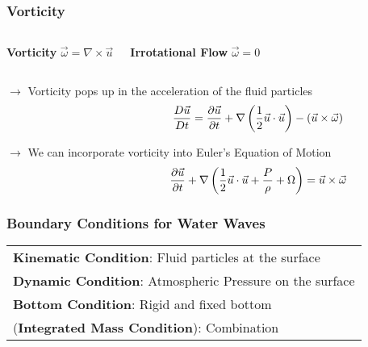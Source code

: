 \documentclass[fleqn]{beamer}
\newcommand{\tabitem}{%
  \usebeamertemplate{itemize item}\hspace*{\labelsep}}
\begin{document}
    \begin{frame}
        \frametitle{Vorticity}
        \begin{columns}
            \begin{block}{\centering\textbf{Vorticity}}
                \centering
                $\vec{\omega} = \nabla \times \vec{u}$
            \end{block}
            \begin{block}{\centering\textbf{Irrotational Flow}}
                \centering
                $\vec{\omega} = 0$
            \end{block}
        \end{columns}
        \vspace{0.5cm}

        \centering $\rightarrow$ Vorticity pops up in the acceleration of
        the fluid particles
        \begin{align}
            \hspace{0.25\linewidth}
            \frac{D\vec{u}}{Dt} = \frac{\partial \vec{u}}{\partial t}+
            \nabla \left( \frac{1}{2} \vec{u} \cdot \vec{u}\right)  - \left(
            \vec{u}\times \vec{\omega}  \right)\nonumber
        \end{align}

        \centering $\rightarrow$ We can incorporate vorticity into Euler's
        Equation of Motion
        \begin{align}
            \hspace{0.25\linewidth}\frac{\partial \vec{u}}{\partial t} + \nabla\left(
            \frac{1}{2}\vec{u}\cdot\vec{u} + \frac{P}{\rho} + \Omega \right)
            = \vec{u} \times \vec{\omega} \nonumber
        \end{align}
    \end{frame}

    \begin{frame}
        \frametitle{Boundary Conditions for Water Waves}
        \begin{center}
        \begin{tabular}{@{}l@{}}
        \tabitem \textbf{Kinematic Condition}: Fluid particles at the
            surface\\
        \tabitem \textbf{Dynamic Condition}: Atmospheric Pressure on
            the surface\\
        \tabitem \textbf{Bottom Condition}: Rigid and fixed bottom\\
        \tabitem (\textbf{Integrated Mass Condition}): Combination
        \end{tabular}
        \end{center}
    \end{frame}
\end{document}
